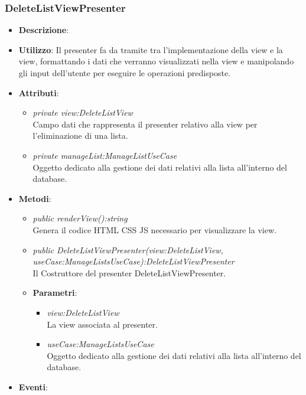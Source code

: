 \subsubsection{DeleteListViewPresenter}
\begin{itemize}
\item \textbf{Descrizione}: 
\item \textbf{Utilizzo}: Il presenter fa da tramite tra l'implementazione della view e la view, formattando i dati che verranno visualizzati nella view e manipolando gli input dell'utente per eseguire le operazioni predisposte.
\item \textbf{Attributi}: 
	\begin{itemize}
	\item \textit{private view:DeleteListView}\\
		Campo dati che rappresenta il presenter relativo alla view per l'eliminazione di una lista.
	\item \textit{private manageList:ManageListUseCase}\\
				Oggetto dedicato alla gestione dei dati relativi alla lista all'interno del database.
	\end{itemize}
\item \textbf{Metodi}:
	\begin{itemize}
	\item \textit{public renderView():string}\\
	Genera il codice HTML CSS JS necessario per visualizzare la view.
	\item \textit{public DeleteListViewPresenter(view:DeleteListView, useCase:ManageListsUseCase):DeleteListViewPresenter}\\
	Il Costruttore del presenter DeleteListViewPresenter.
		\item{\textbf{Parametri}: \begin{itemize}
		\item \textit{view:DeleteListView}\\
			La view associata al presenter.
		\item \textit{useCase:ManageListsUseCase}\\
			Oggetto dedicato alla gestione dei dati relativi alla lista all'interno del database.
		\end{itemize}}
	\end{itemize}
\item \textbf{Eventi}:
\end{itemize}